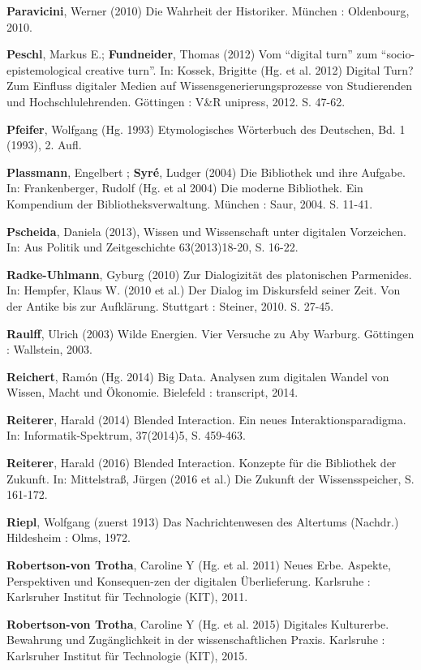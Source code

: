 \documentclass[a4paper,
fontsize=11pt,
oneside,
numbers=noperiodatend,
parskip=half-,
bibliography=totoc,
final
]{scrartcl}
\begin{document}
\textbf{Paravicini}, Werner (2010) Die Wahrheit der Historiker. München
: Oldenbourg, 2010.

\textbf{Peschl}, Markus E.; \textbf{Fundneider}, Thomas (2012) Vom
\enquote{digital turn} zum \enquote{socio-epistemological creative
turn}. In: Kossek, Brigitte (Hg. et al. 2012) Digital Turn? Zum Einfluss
digitaler Medien auf Wissensgenerierungsprozesse von Studierenden und
Hochschlulehrenden. Göttingen : V\&R unipress, 2012. S. 47-62.

\textbf{Pfeifer}, Wolfgang (Hg. 1993) Etymologisches Wörterbuch des
Deutschen, Bd. 1 (1993), 2. Aufl.

\textbf{Plassmann}, Engelbert ; \textbf{Syré}, Ludger (2004) Die
Bibliothek und ihre Aufgabe. In: Frankenberger, Rudolf (Hg. et al 2004)
Die moderne Bibliothek. Ein Kompendium der Bibliotheksverwaltung.
München : Saur, 2004. S. 11-41.

\textbf{Pscheida}, Daniela (2013), Wissen und Wissenschaft unter
digitalen Vorzeichen. In: Aus Politik und Zeitgeschichte 63(2013)18-20,
S. 16-22.

\textbf{Radke-Uhlmann}, Gyburg (2010) Zur Dialogizität des platonischen
Parmenides. In: Hempfer, Klaus W. (2010 et al.) Der Dialog im
Diskursfeld seiner Zeit. Von der Antike bis zur Aufklärung. Stuttgart :
Steiner, 2010. S. 27-45.

\textbf{Raulff}, Ulrich (2003) Wilde Energien. Vier Versuche zu Aby
Warburg. Göttingen : Wallstein, 2003.

\textbf{Reichert}, Ramón (Hg. 2014) Big Data. Analysen zum digitalen
Wandel von Wissen, Macht und Ökonomie. Bielefeld : transcript, 2014.

\textbf{Reiterer}, Harald (2014) Blended Interaction. Ein neues
Interaktionsparadigma. In: Informatik-Spektrum, 37(2014)5, S. 459-463.

\textbf{Reiterer}, Harald (2016) Blended Interaction. Konzepte für die
Bibliothek der Zukunft. In: Mittelstraß, Jürgen (2016 et al.) Die
Zukunft der Wissensspeicher, S. 161-172.

\textbf{Riepl}, Wolfgang (zuerst 1913) Das Nachrichtenwesen des
Altertums (Nachdr.) Hildesheim : Olms, 1972.

\textbf{Robertson-von Trotha}, Caroline Y (Hg. et al. 2011) Neues Erbe.
Aspekte, Perspektiven und Konsequen-zen der digitalen Überlieferung.
Karlsruhe : Karlsruher Institut für Technologie (KIT), 2011.

\textbf{Robertson-von Trotha}, Caroline Y (Hg. et al. 2015) Digitales
Kulturerbe. Bewahrung und Zugänglichkeit in der wissenschaftlichen
Praxis. Karlsruhe : Karlsruher Institut für Technologie (KIT), 2015.
\end{document}
